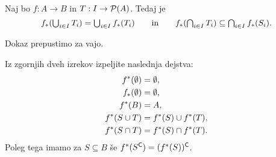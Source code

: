 \begin{izrek}
  Naj bo $f : A \to B$ in $T : I \to \mathcal{P}(A)$. Tedaj je
  \begin{equation*}
    \textstyle
     f_{*} (\bigcup_{i \in I} T_i) = \bigcup_{i \in I} f_{*}(T_i)
     \qquad\text{in}\qquad
     f_{*} (\bigcap_{i \in I} T_i) \subseteq \bigcap_{i \in I} f_{*}(S_i).
  \end{equation*}
\end{izrek}

\begin{dokaz}
  Dokaz prepustimo za vajo.
\end{dokaz}

\begin{naloga}
  Iz zgornjih dveh izrekov izpeljite naslednja dejstva:
  \begin{align*}
    f^{*}(\emptyset) &= \emptyset, \\
    f_{*}(\emptyset) &= \emptyset, \\
    f^{*}(B) &= A, \\
    f^{*}(S \cup T) &= f^{*}(S) \cup f^{*}(T), \\
    f^{*}(S \cap T) &= f^{*}(S) \cap f^{*}(T).
  \end{align*}
  Poleg tega imamo za $S \subseteq B$ še $f^{*}(S^{\mathsf{C}}) = (f^{*}(S))^{\mathsf{C}}$.
\end{naloga}
